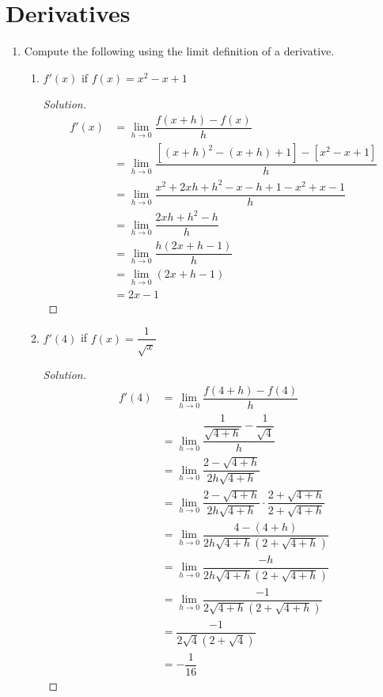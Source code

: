 \documentclass[12pt]{article}
\newenvironment{solution}{\begin{proof}[Solution]}{\end{proof}}
\begin{document}
	\section{Derivatives}
	\begin{enumerate}
		\item Compute the following using the limit definition of a derivative.
	\begin{enumerate}
		\item $f'(x)$ if $f(x)=x^2-x+1$
		\begin{solution}
				\begin{align*}
					f'(x)&=\displaystyle{\lim_{h \to 0} \dfrac{f(x+h)-f(x)}{h}}\\
					&=\displaystyle{\lim_{h \to 0}\dfrac{[(x+h)^2-(x+h)+1]-[x^2-x+1]}{h}}\\
					&=\displaystyle{\lim_{h \to 0}\dfrac{x^2+2xh+h^2-x-h+1-x^2+x-1}{h}}\\
					&=\displaystyle{\lim_{h \to 0}\dfrac{2xh+h^2-h}{h}}\\
					&=\displaystyle{\lim_{h\to 0}\dfrac{h(2x+h-1)}{h}}\\
					&=\displaystyle{\lim_{h\to 0}(2x+h-1)}\\
					&=2x-1
				\end{align*}
			\end{solution}
		\item $f'(4)$ if $f(x)=\dfrac{1}{\sqrt{x}}$
		\begin{solution}
			\begin{align*}
				f'(4)&=\displaystyle{\lim_{h \to 0} \dfrac{f(4+h)-f(4)}{h}}\\
				&=\displaystyle{\lim_{h \to 0}
					\dfrac{\dfrac{1}{\sqrt{4+h}}-\dfrac{1}{\sqrt{4}}}{h}}\\
				&=\displaystyle{\lim_{h \to 0}\dfrac{2-\sqrt{4+h}}{2h\sqrt{4+h}}}\\
				&=\displaystyle{\lim_{h \to 0}\dfrac{2-\sqrt{4+h}}{2h\sqrt{4+h}}\cdot \dfrac{2+\sqrt{4+h}}{2+\sqrt{4+h}}}\\
				&=\displaystyle{\lim_{h\to 0}\dfrac{4-(4+h)}{2h\sqrt{4+h}(2+\sqrt{4+h})}}\\
				&=\displaystyle{\lim_{h\to 0}\dfrac{-h}{2h\sqrt{4+h}(2+\sqrt{4+h})}}\\
				&=\displaystyle{\lim_{h\to 0}\dfrac{-1}{2\sqrt{4+h}(2+\sqrt{4+h})}}\\
				&=\dfrac{-1}{2\sqrt{4}(2+\sqrt{4})}\\
				&=-\dfrac{1}{16}
			\end{align*}
		\end{solution}
	\end{enumerate}
	

\end{enumerate}
\end{document}
